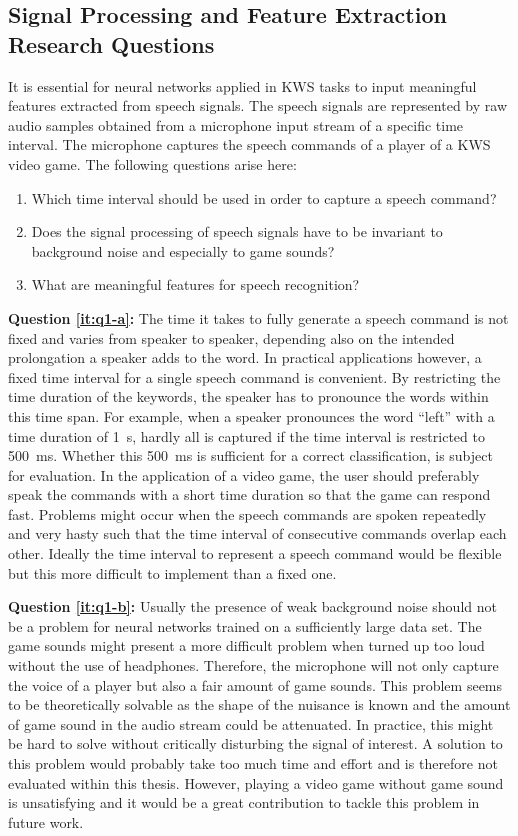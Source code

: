 \subsection{Signal Processing and Feature Extraction Research Questions}\label{sec:intro_rq_signal}
It is essential for neural networks applied in KWS tasks to input meaningful features extracted from speech signals. 
The speech signals are represented by raw audio samples obtained from a microphone input stream of a specific time interval.
The microphone captures the speech commands of a player of a KWS video game.
The following questions arise here:
\begin{enumerate}[label={Q.1.\alph*)}, leftmargin=1.75cm]
  \item Which time interval should be used in order to capture a speech command?\label{it:q1-a}
  \item Does the signal processing of speech signals have to be invariant to background noise and especially to game sounds?\label{it:q1-b}
  \item What are meaningful features for speech recognition?\label{it:q1-c}
\end{enumerate}
\noindent
\textbf{Question \ref{it:q1-a}:} 
The time it takes to fully generate a speech command is not fixed and varies from speaker to speaker, depending also on the intended prolongation a speaker adds to the word.
In practical applications however, a fixed time interval for a single speech command is convenient.
By restricting the time duration of the keywords, the speaker has to pronounce the words within this time span.
For example, when a speaker pronounces the word \enquote{left} with a time duration of \SI{1}{\second}, hardly all is captured if the time interval is restricted to \SI{500}{\milli\second}.
Whether this \SI{500}{\milli\second} is sufficient for a correct classification, is subject for evaluation.
In the application of a video game, the user should preferably speak the commands with a short time duration so that the game can respond fast.
Problems might occur when the speech commands are spoken repeatedly and very hasty such that the time interval of consecutive commands overlap each other.
Ideally the time interval to represent a speech command would be flexible but this more difficult to implement than a fixed one.

\textbf{Question \ref{it:q1-b}:}
Usually the presence of weak background noise should not be a problem for neural networks trained on a sufficiently large data set. 
The game sounds might present a more difficult problem when turned up too loud without the use of headphones. 
Therefore, the microphone will not only capture the voice of a player but also a fair amount of game sounds. 
This problem seems to be theoretically solvable as the shape of the nuisance is known and the amount of game sound in the audio stream could be attenuated.
In practice, this might be hard to solve without critically disturbing the signal of interest.
A solution to this problem would probably take too much time and effort and is therefore not evaluated within this thesis. 
However, playing a video game without game sound is unsatisfying and it would be a great contribution to tackle this problem in future work.

